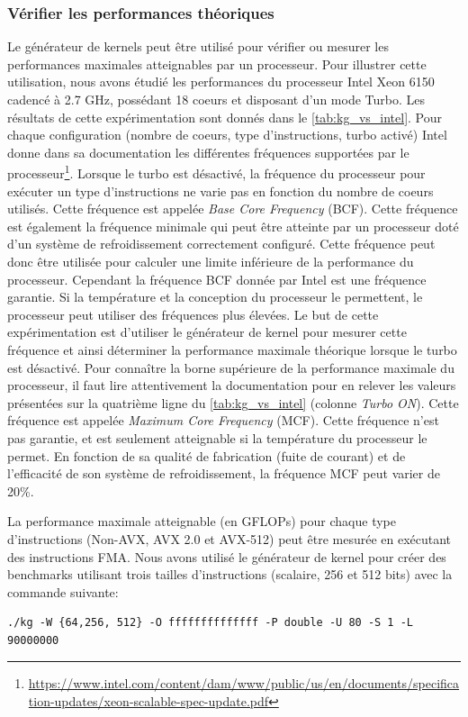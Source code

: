     \subsubsection{Vérifier les performances théoriques}
    Le générateur de kernels peut être utilisé pour vérifier ou mesurer les performances maximales atteignables par un processeur. Pour illustrer cette utilisation, nous avons étudié les performances du processeur Intel Xeon 6150 cadencé à 2.7 GHz, possédant 18 coeurs et disposant d'un mode Turbo. Les résultats de cette expérimentation sont donnés dans le \autoref{tab:kg_vs_intel}. Pour chaque configuration (nombre de coeurs, type d'instructions, turbo activé) Intel donne dans sa documentation les différentes fréquences supportées par le processeur\footnote{\url{https://www.intel.com/content/dam/www/public/us/en/documents/specification-updates/xeon-scalable-spec-update.pdf}}. Lorsque le turbo est désactivé, la fréquence du processeur pour exécuter un type d'instructions ne varie pas en fonction du nombre de coeurs utilisés. Cette fréquence est appelée \textit{Base Core Frequency} (BCF). Cette fréquence est également la fréquence minimale qui peut être atteinte par un processeur doté d'un système de refroidissement correctement configuré. Cette fréquence peut donc être utilisée pour calculer une limite inférieure de la performance du processeur. Cependant la fréquence BCF donnée par Intel est une fréquence garantie. Si la température et la conception du processeur le permettent, le processeur peut utiliser des fréquences plus élevées. Le but de cette expérimentation est d'utiliser le générateur de kernel pour mesurer cette fréquence et ainsi déterminer la performance maximale théorique lorsque le turbo est désactivé. 
    Pour connaître la borne supérieure de la performance maximale du processeur, il faut lire attentivement la documentation pour en relever les valeurs présentées sur la quatrième ligne du \autoref{tab:kg_vs_intel} (colonne \textit{Turbo ON}). Cette fréquence est appelée \textit{Maximum Core Frequency} (MCF). Cette fréquence n'est pas garantie, et est seulement atteignable si la température du processeur le permet. En fonction de sa qualité de fabrication (fuite de courant) et de l'efficacité de son système de refroidissement, la fréquence MCF peut varier de 20\%.  

    
    La performance maximale atteignable (en GFLOPs) pour chaque type d'instructions (Non-AVX, AVX 2.0 et AVX-512) peut être mesurée en exécutant des instructions FMA. Nous avons utilisé le générateur de kernel pour créer des benchmarks utilisant trois tailles d'instructions (scalaire, 256 et 512 bits) avec la commande suivante:
\begin{lstlisting}
./kg -W {64,256, 512} -O ffffffffffffff -P double -U 80 -S 1 -L 90000000
\end{lstlisting}



